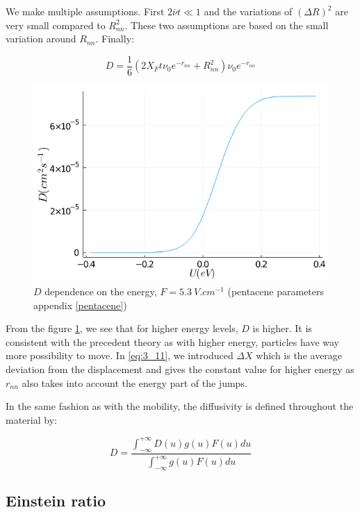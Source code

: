 We make multiple assumptions. First $2\bar\nu t \ll 1$ and the variations of $(\Delta R)^2$ are very small compared to $R_{nn}^2$. These two assumptions are based on the small variation around $R_{nn}$.  Finally:

\begin{equation}
    D = \frac{1}{6} (2X_F t \nu_0 e^{-r_{nn}} + R_{nn}^2) \nu_0 e^{-r_{nn}}
    \label{eq:3_11}
\end{equation}

\begin{figure}[!h]
    \centering
    \includegraphics*[width=.5\paperwidth]{figures/3_elec/d_u.png}
    \caption{$D$ dependence on the energy, $F = \SI{5.3}{V . cm^{-1}}$ (pentacene parameters appendix \ref{pentacene})\label{fig:3_11}}
\end{figure}

From the figure \ref{fig:3_11}, we see that for higher energy levels, $D$ is higher. It is consistent with the precedent theory as with higher energy, particles have way more possibility to move. In \ref{eq:3_11}, we introduced $\Delta X$ which is the average deviation from the displacement and gives the constant value for higher energy as $r_{nn}$ also takes into account the energy part of the jumps.

In the same fashion as with the mobility, the diffusivity is defined throughout the material by:

\begin{equation}
    D = \frac{\int_{-\infty}^{+\infty}D(u)g(u)F(u)du}{\int_{-\infty}^{+\infty}g(u)F(u)du}
    \label{eq:3_12}
\end{equation}

\subsection{Einstein ratio}


